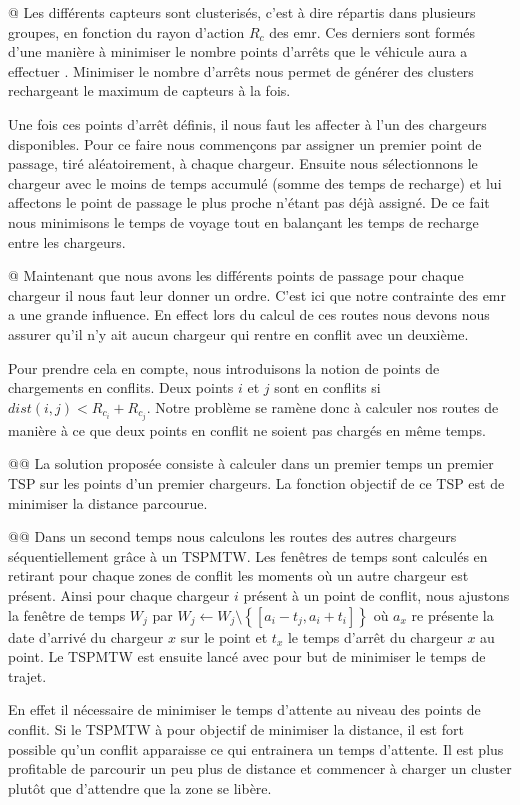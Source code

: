 \documentclass[noposter]{polytech}
\newcommand{\prive}[1]{\setminus\left\lbrace #1\right\rbrace}
\begin{document}
	\begin{easylist}
		@ Les différents capteurs sont clusterisés, c'est à dire répartis dans plusieurs groupes, en fonction du rayon d'action $R_c$ des \gls{emr}.
		Ces derniers sont formés d'une manière à minimiser le nombre points d'arrêts que le véhicule aura a effectuer \cite{KHELLADI201744}.
		Minimiser le nombre d'arrêts nous permet de générer des clusters rechargeant le maximum de capteurs à la fois.
		
		Une fois ces points d'arrêt définis, il nous faut les affecter à l'un des chargeurs disponibles.
		Pour ce faire nous commençons par assigner un premier point de passage, tiré aléatoirement, à chaque chargeur.
		Ensuite nous sélectionnons le chargeur avec le moins de temps accumulé (somme des temps de recharge) et lui affectons le point de passage le plus proche n'étant pas déjà assigné.
		De ce fait nous minimisons le temps de voyage tout en balançant les temps de recharge entre les chargeurs.
		
		@ Maintenant que nous avons les différents points de passage pour chaque chargeur il nous faut leur donner un ordre.
		C'est ici que notre contrainte des \gls{emr} a une grande influence.
		En effect lors du calcul de ces routes nous devons nous assurer qu'il n'y ait aucun chargeur qui rentre en conflit avec un deuxième.
		
		Pour prendre cela en compte, nous introduisons la notion de points de chargements en conflits.
		Deux points $i$ et $j$ sont en conflits si $dist\left(i,j\right)<R_{c_i}+R_{c_j}$.
		Notre problème se ramène donc à calculer nos routes de manière à ce que deux points en conflit ne soient pas chargés en même temps.
		
		@@ La solution proposée consiste à calculer dans un premier temps un premier TSP sur les points d'un premier chargeurs.
		La fonction objectif de ce TSP est de minimiser la distance parcourue.
		
		@@ Dans un second temps nous calculons les routes des autres chargeurs séquentiellement grâce à un TSPMTW.
		Les fenêtres de temps sont calculés en retirant pour chaque zones de conflit les moments où un autre chargeur est présent.
		Ainsi pour chaque chargeur $i$ présent à un point de conflit, nous ajustons la fenêtre de temps $W_j$ par $W_j\leftarrow W_j\prive{\left[a_i-t_j, a_i+t_i\right]}$ où $a_x$ re présente la date d'arrivé du chargeur $x$ sur le point et $t_x$ le temps d'arrêt du chargeur $x$ au point.
		Le TSPMTW est ensuite lancé avec pour but de minimiser le temps de trajet.
		
		En effet il nécessaire de minimiser le temps d'attente au niveau des points de conflit.
		Si le TSPMTW à pour objectif de minimiser la distance, il est fort possible qu'un conflit apparaisse ce qui entrainera un temps d'attente.
		Il est plus profitable de parcourir un peu plus de distance et commencer à charger un cluster plutôt que d'attendre que la zone se libère.
	\end{easylist}
	
\end{document}
